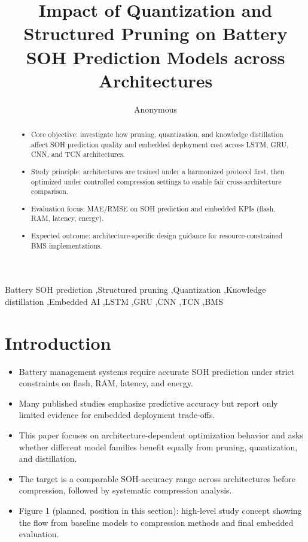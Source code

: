 ﻿\documentclass[review]{elsarticle}
\date{}
\begin{document}
\linenumbers
\begin{frontmatter}
\title{Impact of Quantization and Structured Pruning on Battery SOH Prediction Models across Architectures}

\author{Anonymous}

\begin{abstract}
\begin{itemize}[leftmargin=*]
\item Core objective: investigate how pruning, quantization, and knowledge distillation affect SOH prediction quality and embedded deployment cost across LSTM, GRU, CNN, and TCN architectures.
\item Study principle: architectures are trained under a harmonized protocol first, then optimized under controlled compression settings to enable fair cross-architecture comparison.
\item Evaluation focus: MAE/RMSE on SOH prediction and embedded KPIs (flash, RAM, latency, energy).
\item Expected outcome: architecture-specific design guidance for resource-constrained BMS implementations.
\end{itemize}
\end{abstract}

\begin{keyword}
Battery SOH prediction \sep Structured pruning \sep Quantization \sep Knowledge distillation \sep Embedded AI \sep LSTM \sep GRU \sep CNN \sep TCN \sep BMS
\end{keyword}
\end{frontmatter}

\section{Introduction}
\begin{itemize}[leftmargin=*]
\item Battery management systems require accurate SOH prediction under strict constraints on flash, RAM, latency, and energy.
\item Many published studies emphasize predictive accuracy but report only limited evidence for embedded deployment trade-offs.
\item This paper focuses on architecture-dependent optimization behavior and asks whether different model families benefit equally from pruning, quantization, and distillation.
\item The target is a comparable SOH-accuracy range across architectures before compression, followed by systematic compression analysis.
\item Figure 1 (planned, position in this section): high-level study concept showing the flow from baseline models to compression methods and final embedded evaluation.
\end{itemize}
\end{document}
